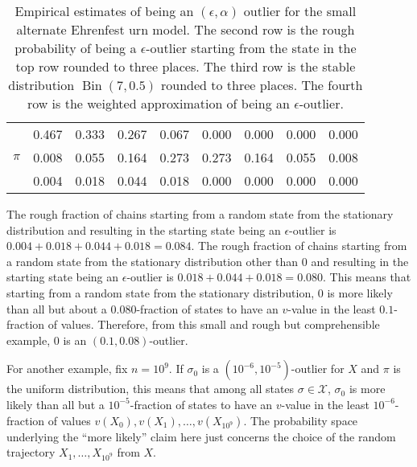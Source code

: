 \documentclass[12pt]{article}
\begin{document}
\begin{example}
\begin{table}
\begin{tabular}{l|cccccccc}
                     & 0.467 & 0.333 & 0.267 & 0.067 & 0.000 & 0.000 & 0.000 & 0.000 \\ 
            \( \pi \)& 0.008 & 0.055 & 0.164 & 0.273 & 0.273 & 0.164 & 0.055 & 0.008 \\ 
                     & 0.004 & 0.018 & 0.044 & 0.018 & 0.000 & 0.000 & 0.000 & 0.000 \\ 
        \end{tabular}
        \caption{Empirical estimates of being an \( (\epsilon, \alpha) \)
        outlier for the small alternate Ehrenfest urn model.  The second
        row is the rough probability of being a \( \epsilon \)-outlier
        starting from the state in the top row rounded to three places.
        The third row is the stable distribution \(
        \operatorname{Bin}
        (7, 0.5) \) rounded to three places.  The fourth row is the
        weighted approximation of being an \( \epsilon \)-outlier.  }%
        \label{tab:parallelsignificance:epsalpha}
    \end{table}

    The rough fraction of chains starting from a random state from the
    stationary distribution and resulting in the starting state being an
    \( \epsilon \)-outlier is \( 0.004 + 0.018 + 0.044 + 0.018 = 0.084 \).
    The rough fraction of chains starting from a random state from the
    stationary distribution other than \( 0 \) and resulting in the
    starting state being an \( \epsilon \)-outlier is \( 0.018 + 0.044 +
    0.018 = 0.080 \).  This means that starting from a random state from
    the stationary distribution,
    \( 0 \) is more likely than all but about a \( 0.080 \)-fraction of
    states to have an \( v \)-value in the least \( 0.1 \)-fraction of
    values.  Therefore, from this small and rough but comprehensible
    example, \( 0 \) is an \( (0.1, 0.08) \)-outlier.

\end{example}

\begin{example}
    For another example, fix \( n = 10^9 \).  If \( \sigma_0 \) is a \(
    (10^{-6}, 10^{-5}) \)-outlier for \( X \) and \( \pi \) is the
    uniform distribution, this means that among all states \( \sigma \in
    \mathcal{X} \), \( \sigma_0 \) is more likely than all but a \( 10^{-5}
    \)-fraction of states to have an \( v \)-value in the least \( 10^{-6}
    \)-fraction of values \( v(X_0), v(X_1 ), \dots , v(X_{10^9} ) \).
    The probability space underlying the ``more likely'' claim here just
    concerns the choice of the random trajectory \( X_1, \dots, X_{10^9}
    \) from \( X \).
\end{example}
\end{document}

